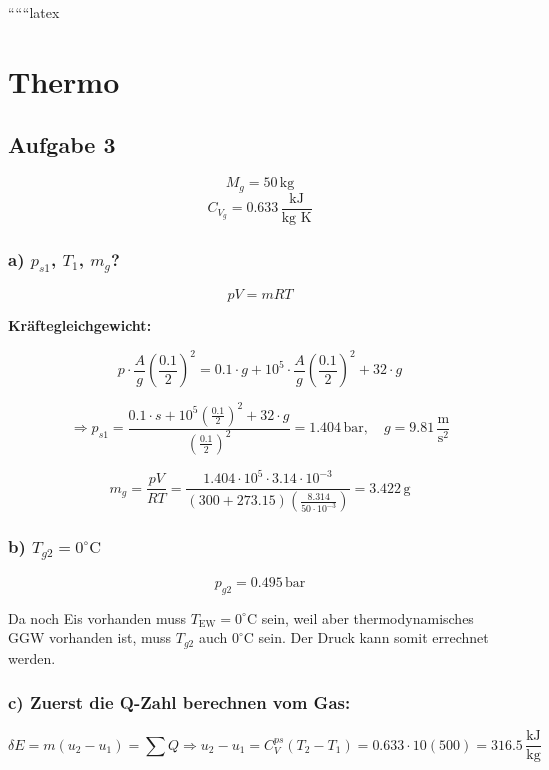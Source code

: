
``````latex


\section*{Thermo}

\subsection*{Aufgabe 3}

\[
M_g = 50 \, \text{kg}
\]
\[
C_{V_{g}} = 0.633 \, \frac{\text{kJ}}{\text{kg K}}
\]

\subsubsection*{a) $p_{s1}$, $T_1$, $m_{g}$?}

\[
p V = m R T
\]

\textbf{Kräftegleichgewicht:}

\[
p \cdot \frac{A}{g} \left( \frac{0.1}{2} \right)^2 = 0.1 \cdot g + 10^5 \cdot \frac{A}{g} \left( \frac{0.1}{2} \right)^2 + 32 \cdot g
\]

\[
\Rightarrow p_{s1} = \frac{0.1 \cdot s + 10^5 \left( \frac{0.1}{2} \right)^2 + 32 \cdot g}{\left( \frac{0.1}{2} \right)^2} = 1.404 \, \text{bar}, \quad g = 9.81 \, \frac{\text{m}}{\text{s}^2}
\]

\[
m_g = \frac{p V}{R T} = \frac{1.404 \cdot 10^5 \cdot 3.14 \cdot 10^{-3}}{(300 + 273.15) \left( \frac{8.314}{50 \cdot 10^{-3}} \right)} = 3.422 \, \text{g}
\]

\subsubsection*{b) $T_{g2} = 0^\circ \text{C}$}

\[
p_{g2} = 0.495 \, \text{bar}
\]

Da noch Eis vorhanden muss $T_{\text{EW}} = 0^\circ \text{C}$ sein, weil aber thermodynamisches GGW vorhanden ist, muss $T_{g2}$ auch $0^\circ \text{C}$ sein. Der Druck kann somit errechnet werden.

\subsubsection*{c) Zuerst die Q-Zahl berechnen vom Gas:}

\[
\delta E = m (u_2 - u_1) = \sum Q \Rightarrow u_2 - u_1 = C_V^{ps} (T_2 - T_1) = 0.633 \cdot 10 \left( 500 \right) = 316.5 \, \frac{\text{kJ}}{\text{kg}}
\]

